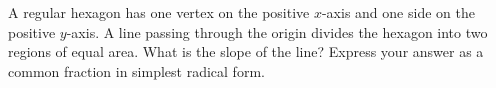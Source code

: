 A regular hexagon has one vertex on the positive $x$-axis and one side on the positive $y$-axis. A line passing through the origin divides the hexagon into two regions of equal area. What is the slope of the line? Express your answer as a common fraction in simplest radical form.
